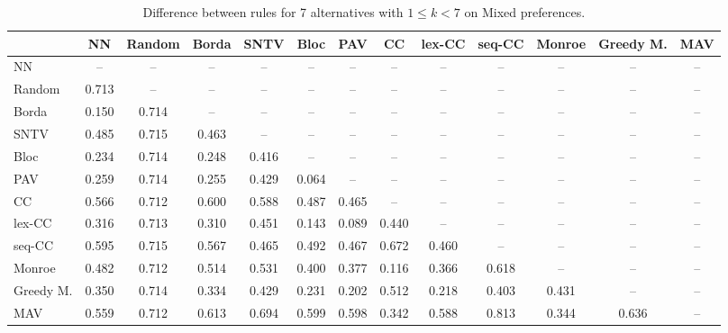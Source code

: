 
\begin{table*}[h!]
\centering
\begin{tabular}{lcccccccccccc}
\toprule
 & NN & Random & Borda & SNTV & Bloc & PAV & CC & lex-CC & seq-CC & Monroe & Greedy M. & MAV \\
\midrule
NN & -- & -- & -- & -- & -- & -- & -- & -- & -- & -- & -- & -- \\
Random & 0.713 & -- & -- & -- & -- & -- & -- & -- & -- & -- & -- & -- \\
Borda & 0.150 & 0.714 & -- & -- & -- & -- & -- & -- & -- & -- & -- & -- \\
SNTV & 0.485 & 0.715 & 0.463 & -- & -- & -- & -- & -- & -- & -- & -- & -- \\
Bloc & 0.234 & 0.714 & 0.248 & 0.416 & -- & -- & -- & -- & -- & -- & -- & -- \\
PAV & 0.259 & 0.714 & 0.255 & 0.429 & 0.064 & -- & -- & -- & -- & -- & -- & -- \\
CC & 0.566 & 0.712 & 0.600 & 0.588 & 0.487 & 0.465 & -- & -- & -- & -- & -- & -- \\
lex-CC & 0.316 & 0.713 & 0.310 & 0.451 & 0.143 & 0.089 & 0.440 & -- & -- & -- & -- & -- \\
seq-CC & 0.595 & 0.715 & 0.567 & 0.465 & 0.492 & 0.467 & 0.672 & 0.460 & -- & -- & -- & -- \\
Monroe & 0.482 & 0.712 & 0.514 & 0.531 & 0.400 & 0.377 & 0.116 & 0.366 & 0.618 & -- & -- & -- \\
Greedy M. & 0.350 & 0.714 & 0.334 & 0.429 & 0.231 & 0.202 & 0.512 & 0.218 & 0.403 & 0.431 & -- & -- \\
MAV & 0.559 & 0.712 & 0.613 & 0.694 & 0.599 & 0.598 & 0.342 & 0.588 & 0.813 & 0.344 & 0.636 & -- \\
\bottomrule
\end{tabular}

\caption{Difference between rules for 7 alternatives with $1 \leq k < 7$ on Mixed preferences.}
\end{table*}
